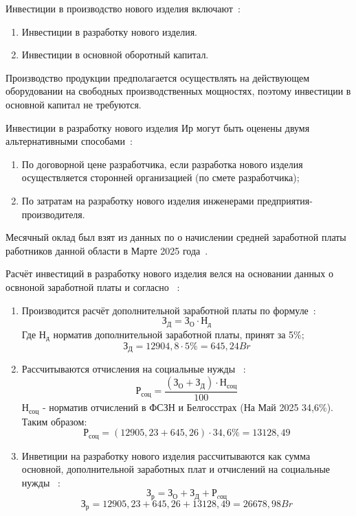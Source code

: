 Инвестиции в производство нового изделия включают~\cite{bsuir-project-economics}:
\begin{enumerate}
\item Инвестиции в разработку нового изделия.
\item Инвестиции в основной оборотный капитал.
\end{enumerate}

Производство продукции предполагается осуществлять на действующем
оборудовании на свободных производственных мощностях, поэтому
инвестиции в основной капитал не требуются.


Инвестиции в разработку нового изделия $Ир$ могут быть оценены двумя
альтернативными способами~\cite{bsuir-project-economics}:
\begin{enumerate}
\item По договорной цене разработчика, если разработка нового изделия
  осуществляется сторонней организацией (по смете разработчика);
\item По затратам на разработку нового изделия инженерами
  предприятия-производителя.
\end{enumerate}



Месячный оклад был взят из данных по о начислении средней заработной
платы работников данной области в Марте 2025
года~\cite{belstat-salary}.

% 

Расчёт инвестиций в разработку нового изделия велся на основании данных о освноной
заработной платы и согласно ~\cite{bsuir-project-economics}:
\begin{enumerate}
\item Производится расчёт дополнительной заработной платы по формуле~\cite{bsuir-project-economics}:
  \begin{equation} З_Д = З_О \cdot Н_д \end{equation}
  Где $Н_д$ норматив дополнительной заработной платы, принят за 5\%;
  $$З_Д = 12904,8 \cdot 5\% = 645,24Br $$
\item Рассчитываются отчисления на социальные нужды ~\cite{bsuir-project-economics}:
  \begin{equation}
    Р_{соц} = \frac{(З_О + З_Д) \cdot Н_{соц}}{100}
  \end{equation}
  $Н_{соц}$ - норматив отчислений в ФСЗН и Белгосстрах (На Май 2025 34,6\%).
  Таким образом:
  $$Р_{соц} = (12905,23 + 645,26) \cdot 34,6\% = 13128,49$$
\item Инветиции на разработку нового изделия рассчитываются как сумма
основной, дополнительной заработных плат и отчислений на социальные
нужды ~\cite{bsuir-project-economics}:
\begin{equation}
  З_р = З_О + З_Д +Р_{cоц}
\end{equation}
 $$ З_р = 12905,23 + 645,26 + 13128,49 = 26678,98Br$$
\end{enumerate}


